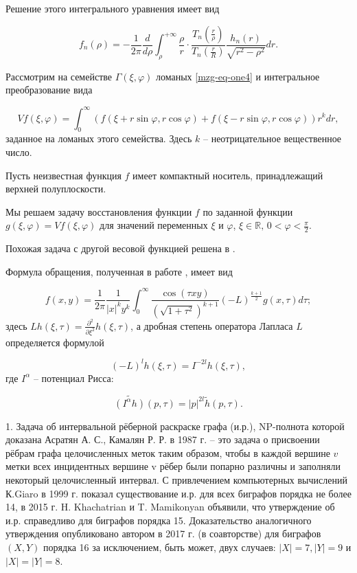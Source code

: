 Решение этого интегрального уравнения имеет вид

$$f_n(\rho)=-\frac{1}{2\pi}\frac{d}{d\rho}\int_\rho^{+\infty}\frac{\rho}{r}\cdot\frac{T_n\left(\frac{r}{\rho}\right)}{T_n\left(\frac{r}{R}\right)}\frac{h_n(r)}{\sqrt{r^2-\rho^2}}dr.$$

Рассмотрим на семействе $\Gamma(\xi,\varphi)$ ломаных \eqref{mzg-eq-one4} и интегральное преобразование вида

\begin{equation}
\label{mzg-eq-one5}
Vf(\xi,\varphi)=\int_0^\infty\left( f(\xi+ r \sin \varphi, r \cos \varphi)+f(\xi-r \sin \varphi, r \cos \varphi)\right)r^k dr,
\end{equation}
заданное на ломаных этого семейства. Здесь $k$ -- неотрицательное вещественное число.

Пусть неизвестная функция $f$ имеет компактный носитель, принадлежащий верхней полуплоскости.

Мы решаем задачу восстановления функции $f$ по заданной функции $g(\xi,\varphi)=Vf(\xi,\varphi)$ для значений переменных $\xi$ и $\varphi$, $\xi\in\mathbb R,\, 0<\varphi<\frac{\pi}{2}$.

Похожая задача с другой весовой функцией решена в \cite{mzg-Kuchment}.

Формула обращения, полученная в работе \cite{mzg-Medzhidov2}, имеет вид

\begin{equation}
\label{mzg-eq-one8}
f(x,y)=\frac{1}{2\pi}\frac{1}{|x|^k y^k}\int_0^\infty \frac{\cos (\tau xy) }{\left(\sqrt{1+\tau^2}\right)^{k+1}}(-L)^{\frac{k+1}{2}}g(x,\tau)d\tau;
\end{equation}
здесь $Lh(\xi,\tau)=\frac{\partial^2}{\partial\xi^2 }h(\xi,\tau)$, а дробная степень оператора Лапласа $L$ определяется формулой

$$(-L)^lh(\xi,\tau)=I^{-2l}h(\xi,\tau),$$
где $I^\alpha$ -- потенциал Рисса:

$$\widetilde{\left(I^\alpha h\right)}(p,\tau)=|p|^{2l}\tilde h(p,\tau).$$




1. Задача об интервальной рёберной раскраске графа (и.р.), NP-полнота которой доказана Асратян А. С., Камалян Р. Р. в 1987 г. -- это задача о присвоении рёбрам графа целочисленных меток таким образом, чтобы в каждой вершине $v$ метки всех инцидентных вершине v рёбер были попарно различны и заполняли некоторый целочисленный интервал. С привлечением компьютерных вычислений К.Giaro в 1999 г. показал существование и.р. для всех биграфов порядка не более 14, в 2015 г. H. Khachatrian и T. Mamikonyan объявили, что  утверждение об и.р. справедливо для биграфов порядка 15. Доказательство аналогичного утверждения опубликовано автором в 2017 г. (в соавторстве) для биграфов $(X,Y)$ порядка 16 за исключением, быть может, двух случаев: $|X|=7, |Y|=9$  и $|X|=|Y|=8$.

